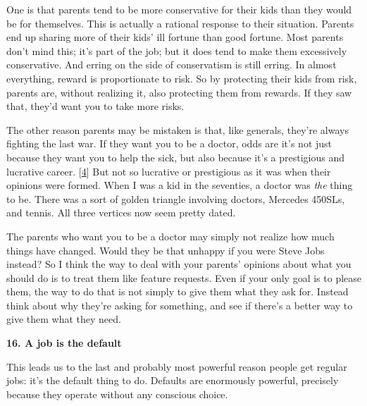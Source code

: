 One is that parents tend to be more
                    conservative for their kids than they would be for
                    themselves. This is actually a rational response to their
                    situation. Parents end up sharing more of their kids' ill
                    fortune than good fortune. Most parents don't mind this;
                    it's part of the job; but it does tend to make them
                    excessively conservative. And erring on the side of
                    conservatism is still erring. In almost everything, reward
                    is proportionate to risk. So by protecting their kids from
                    risk, parents are, without realizing it, also protecting
                    them from rewards. If they saw that, they'd want you to take
                    more risks.

The other reason parents may be
                    mistaken is that, like generals, they're always fighting the
                    last war. If they want you to be a doctor, odds are it's not
                    just because they want you to help the sick, but also
                    because it's a prestigious and lucrative career.
                    [\href{\#f4n}{4}]
                    But not so lucrative or prestigious as it was when their
                    opinions were formed. When I was a kid in the seventies, a
                    doctor was \emph{the} thing to be. There was a sort of
                    golden triangle involving doctors, Mercedes 450SLs, and
                    tennis. All three vertices now seem pretty dated.

The
                    parents who want you to be a doctor may simply not realize
                    how much things have changed. Would they be that unhappy if
                    you were Steve Jobs instead? So I think the way to deal with
                    your parents' opinions about what you should do is to treat
                    them like feature requests. Even if your only goal is to
                    please them, the way to do that is not simply to give them
                    what they ask for. Instead think about why they're asking
                    for something, and see if there's a better way to give them
                    what they need.

\textbf{16. A job is the default}

This leads us to the last and probably most
                    powerful reason people get regular jobs: it's the default
                    thing to do. Defaults are enormously powerful, precisely
                    because they operate without any conscious choice.

